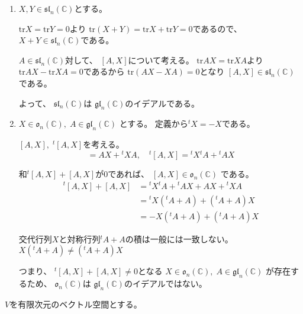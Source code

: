 \documentclass[12pt,b5paper]{ltjsarticle}
\begin{document}
\begin{enumerate}
 \item
      $X,Y \in \mathfrak{sl}_{n}(\mathbb{C})$とする。

      $\mathrm{tr}{X}=\mathrm{tr}{Y}=0$より
      $\mathrm{tr}{(X+Y)}=\mathrm{tr}{X}+\mathrm{tr}{Y}=0$であるので、
      $X+Y \in \mathfrak{sl}_{n}(\mathbb{C})$である。

      $A \in\mathfrak{sl}_{n}(\mathbb{C})$対して、
      $[A,X]$について考える。
      $\mathrm{tr}{AX}=\mathrm{tr}{XA}$より
      $\mathrm{tr}{AX}-\mathrm{tr}{XA}=0$であるから
      $\mathrm{tr}{(AX-XA)}=0$となり
      $[A,X] \in \mathfrak{sl}_{n}(\mathbb{C})$
      である。

      よって、
      $\mathfrak{sl}_{n}(\mathbb{C})$は
      $\mathfrak{gl}_{n}(\mathbb{C})$のイデアルである。

 \item
      $X\in \mathfrak{o}_{n}(\mathbb{C}),\; A\in\mathfrak{gl}_{n}(\mathbb{C})$
      とする。
      定義から${}^{t}X=-X$である。

      $[A,X],\;{}^{t}[A,X]$を考える。
      \begin{equation}
       [A,X] = AX+{}^{t}XA
        ,\quad
       {}^{t}[A,X] = {}^{t}X{}^{t}A+{}^{t}AX
      \end{equation}

      和${}^{t}[A,X]+[A,X]$が$0$であれば、
      $[A,X]\in \mathfrak{o}_{n}(\mathbb{C})$
      である。
      \begin{align}
       {}^{t}[A,X] + [A,X]
       &= {}^{t}X{}^{t}A+{}^{t}AX + AX+{}^{t}XA\\
        &={}^{t}X ({}^{t}A+A)+({}^{t}A + A)X\\
        &=-X ({}^{t}A+A)+({}^{t}A + A)X
      \end{align}

      交代行列$X$と対称行列${}^{t}A + A$の積は一般には一致しない。
      $X ({}^{t}A+A) \ne ({}^{t}A + A)X$

      つまり、
      ${}^{t}[A,X]+[A,X] \ne 0$となる
      $X\in \mathfrak{o}_{n}(\mathbb{C}),\; A\in\mathfrak{gl}_{n}(\mathbb{C})$
      が存在するため、
      $\mathfrak{o}_{n}(\mathbb{C})$は
      $\mathfrak{gl}_{n}(\mathbb{C})$のイデアルではない。

\end{enumerate}



\hrulefill


$V$を有限次元のベクトル空間とする。
\end{document}
